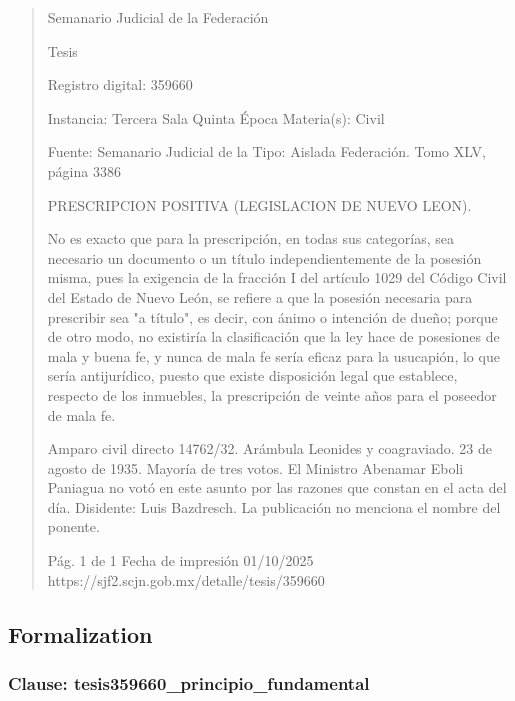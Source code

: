 \documentclass[11pt,a4paper]{article}
\begin{document}
\begin{quote}
                                                   Semanario Judicial de la Federación

                                                  Tesis

 Registro digital: 359660

 Instancia: Tercera Sala          Quinta Época                         Materia(s): Civil

                                  Fuente: Semanario Judicial de la     Tipo: Aislada
                                  Federación.
                                  Tomo XLV, página 3386


PRESCRIPCION POSITIVA (LEGISLACION DE NUEVO LEON).


No es exacto que para la prescripción, en todas sus categorías, sea necesario un documento o un
título independientemente de la posesión misma, pues la exigencia de la fracción I del artículo 1029
del Código Civil del Estado de Nuevo León, se refiere a que la posesión necesaria para prescribir
sea "a título", es decir, con ánimo o intención de dueño; porque de otro modo, no existiría la
clasificación que la ley hace de posesiones de mala y buena fe, y nunca de mala fe sería eficaz para
la usucapión, lo que sería antijurídico, puesto que existe disposición legal que establece, respecto
de los inmuebles, la prescripción de veinte años para el poseedor de mala fe.


Amparo civil directo 14762/32. Arámbula Leonides y coagraviado. 23 de agosto de 1935. Mayoría
de tres votos. El Ministro Abenamar Eboli Paniagua no votó en este asunto por las razones que
constan en el acta del día. Disidente: Luis Bazdresch. La publicación no menciona el nombre del
ponente.




                                             Pág. 1 de 1             Fecha de impresión 01/10/2025
  https://sjf2.scjn.gob.mx/detalle/tesis/359660

\end{quote}

\subsection{Formalization}

\subsubsection{Clause: tesis359660\_principio\_fundamental}
\end{document}
